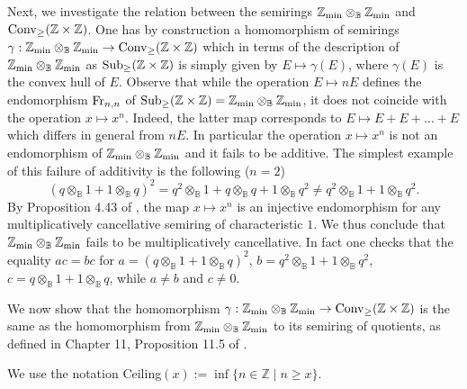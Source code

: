 \documentclass[noams,lp]{compositio}
\def\B{{\mathbb B}}
\def\Z{{\mathbb Z}}
\def\sub{{\rm Sub}_\geq}
\def\conv{{\rm Conv}_\geq}
\def\zmin{\Z_{\rm min}}
\def\fr{{\rm Fr}}
\def\nbo{{\zmin\otimes_\B \zmin}}
\begin{document}
Next, we investigate the relation between the semirings $\nbo$ and $\conv(\Z\times \Z)$. One has by construction a homomorphism of semirings $\gamma:\nbo\to\conv(\Z\times \Z)$ which in terms of the description of $\nbo$ as $\sub(\Z\times \Z)$ is simply given by $E\mapsto \gamma(E)$, where $\gamma(E)$ is the convex hull of $E$. Observe that while the operation $E\mapsto nE$ defines the endomorphism $ \fr_{n,n}$ of $\sub(\Z\times \Z)=\nbo$, it does not coincide with the operation $x\mapsto x^n$. Indeed, the latter map corresponds to $E\mapsto E+E+\ldots +E$ which differs in general from $nE$. In particular  the operation $x\mapsto x^n$ is not an endomorphism of $\nbo$ and it fails to be additive. The simplest example of this failure of additivity is the following ($n=2$)
$$
(q\otimes_\B 1+1\otimes_\B q)^2=q^2\otimes_\B 1+q\otimes_\B q +1\otimes_\B q^2\neq q^2\otimes_\B 1+1\otimes_\B q^2.
$$
By Proposition 4.43 of \cite{Golan}, the map $x\mapsto x^n$ is an injective endomorphism for any multiplicatively cancellative semiring of characteristic $1$. We thus conclude that $\nbo$ fails to be multiplicatively cancellative. In fact one checks that the equality $ac=bc$ for $a=(q\otimes_\B 1+1\otimes_\B q)^2$, $b=q^2\otimes_\B 1+1\otimes_\B q^2$, $c=q\otimes_\B 1+1\otimes_\B q$, while $a\neq b$ and $c\neq 0$.

We now show that the homomorphism $\gamma:\nbo\to\conv(\Z\times \Z)$ is the same as the homomorphism from $\nbo$ to its semiring of quotients, as defined in Chapter 11, Proposition 11.5 of \cite{Golan}. 

We use the notation Ceiling$(x):=\inf \{n\in\Z\mid n\geq x\}$.
\end{document}
